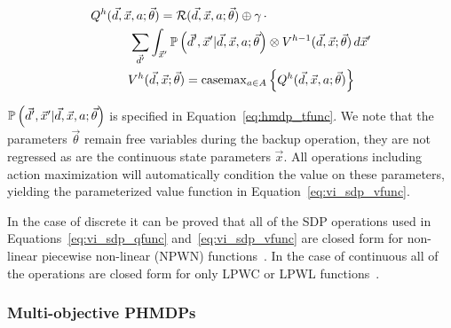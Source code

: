 {\footnotesize 
    \abovedisplayskip=0pt
    \belowdisplayskip=0pt
    \begin{align}
        Q^{h}(\vec{d}, \vec{x}, a; \vec{\theta}) = \mathcal{R}(\vec{d}, \vec{x}, a; \vec{\theta}) \oplus \gamma \, \cdot &  \nonumber \\ 
        \sum_{\vec{d}'} \int_{\vec{x}'} \mathbb{P}\left({\vec{d}', \vec{x}' | \vec{d}, \vec{x}, a; \vec{\theta}}\right) & \otimes V^{h-1}(\vec{d}, \vec{x}; \vec{\theta}) \, d\vec{x}'  \label{eq:vi_sdp_qfunc} \\
        V^{h}(\vec{d}, \vec{x}; \vec{\theta}) = \mathrm{casemax}_{a \in A} & \left\{ Q^{h}(\vec{d}, \vec{x}, a; \vec{\theta}) \right\} \label{eq:vi_sdp_vfunc}
    \end{align}
}%

{\footnotesize $\mathbb{P}\left({\vec{d}', \vec{x}' | \vec{d}, \vec{x}, a; \vec{\theta}}\right)$ } is specified in Equation~\eqref{eq:hmdp_tfunc}. We note that the parameters {\footnotesize $\vec{\theta}$} remain free variables during the backup operation, they are not regressed as are the continuous state parameters {\footnotesize $ \vec{x} $}. All operations including action maximization will automatically condition the value on these parameters, yielding the parameterized value function in Equation~\eqref{eq:vi_sdp_vfunc}.

In the case of discrete {\footnotesize \Action} it can be proved that all of the SDP operations used in Equations~\eqref{eq:vi_sdp_qfunc} and~\eqref{eq:vi_sdp_vfunc} are closed form for non-linear piecewise non-linear (NPWN) functions~\parencite{Sanner_UAI_2011}. In the case of continuous {\footnotesize \Action} all of the operations are closed form for only LPWC or LPWL functions~\parencite{Zamani_AAAI_2012}.


\subsubsection{Multi-objective PHMDPs}

